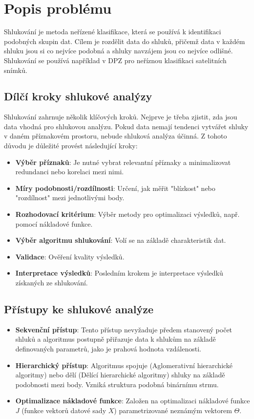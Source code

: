 \section{Popis problému}

Shlukování je metoda neřízené klasifikace, která se používá k identifikaci podobných skupin dat. Cílem je rozdělit data do shluků, přičemž data v každém shluku jsou si co nejvíce podobná a shluky navzájem jsou co nejvíce odlišné. Shlukování se používá například v DPZ pro neříznou klasifikaci satelitních snímků.\cite{potuckova2024}

\subsection{Dílčí kroky shlukové analýzy}

Shlukování zahrnuje několik klíčových kroků. Nejprve je třeba zjistit, zda jsou data vhodná pro shlukovou analýzu. Pokud data nemají tendenci vytvářet shluky v daném příznakovém prostoru, nebude shluková analýza účinná. Z tohoto důvodu je důležité provést následující kroky:

\begin{itemize}
    \item \textbf{Výběr příznaků}: Je nutné vybrat relevantní příznaky a minimalizovat redundanci nebo korelaci mezi nimi.
    \item \textbf{Míry podobnosti/rozdílnosti}: Určení, jak měřit "blízkost" nebo "rozdílnost" mezi jednotlivými body.
    \item \textbf{Rozhodovací kritérium}: Výběr metody pro optimalizaci výsledků, např. pomocí nákladové funkce.
    \item \textbf{Výběr algoritmu shlukování}: Volí se na základě charakteristik dat.
    \item \textbf{Validace}: Ověření kvality výsledků.
    \item \textbf{Interpretace výsledků}: Posledním krokem je interpretace výsledků získaných ze shlukování.
\end{itemize}

\subsection{Přístupy ke shlukové analýze}

\begin{itemize}
    \item \textbf{Sekvenční přístup}: Tento přístup nevyžaduje předem stanovený počet shluků a algoritmus postupně přiřazuje data k shlukům na základě definovaných parametrů, jako je prahová hodnota vzdálenosti.
    \item \textbf{Hierarchický přístup}: Algoritmus spojuje (Aglomerativní hierarchické algoritmy) nebo dělí (Dělící hierarchické algoritmy) shluky na základě podobnosti mezi body. Vzniká struktura podobná binárnímu strmu.
    \item \textbf{Optimalizace nákladové funkce}: Založen na optimalizaci nákladové funkce \(J\) (funkce vektorů datové sady \(X\)) parametrizované neznámým vektorem \(\Theta\).
\end{itemize}


